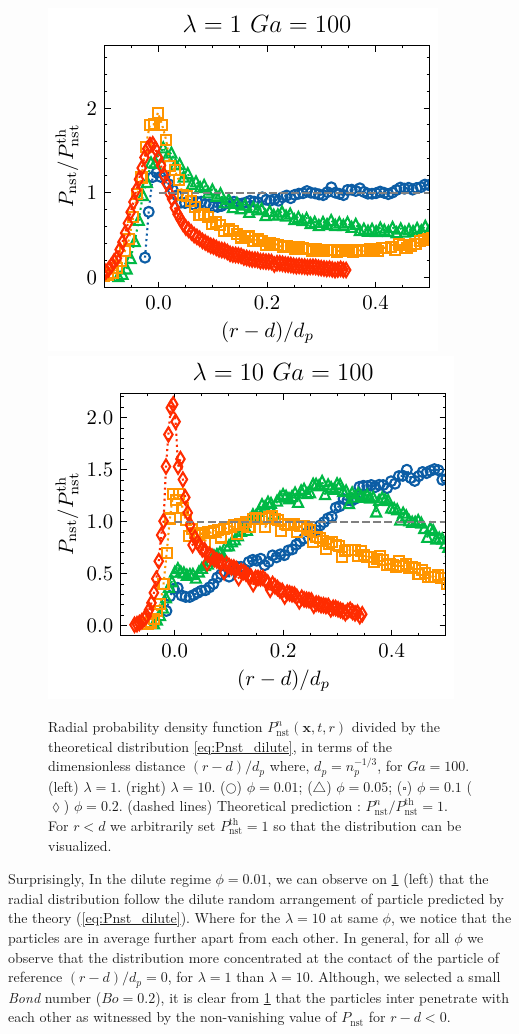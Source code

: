 \begin{figure}[h!]
    \centering
    \includegraphics[height=0.3\textwidth]{image/HOMOGENEOUS_NEW/Dist/Pr_l_1_Ga_100.pdf}
    \includegraphics[height=0.3\textwidth]{image/HOMOGENEOUS_NEW/Dist/Pr_l_10_Ga_100.pdf}
    \caption{Radial probability density function $P_\text{nst}^n(\textbf{x},t,r)$ divided by the theoretical distribution \ref{eq:Pnst_dilute}, in terms of the dimensionless distance $(r-d)/d_p$ where, $d_p = n_p^{-1/3}$, for  $Ga = 100$.
    (left)  $\lambda = 1$.
    (right) $\lambda = 10$.
    ($\pmb\bigcirc$) $\phi = 0.01$; ($\pmb\triangle$) $ \phi = 0.05$; ($\pmb\square$) $\phi = 0.1$ ($\pmb\lozenge$) $\phi = 0.2$.
    (dashed lines) Theoretical prediction : $P_\text{nst}^n/P_\text{nst}^\text{th} = 1$. 
    For $r<d$ we arbitrarily set $P_\text{nst}^\text{th} = 1$ so that the distribution can be visualized.
    }
    \label{fig:Pr}
\end{figure}
Surprisingly, In the dilute regime $\phi = 0.01$, we can observe on \ref{fig:Pr} (left) that the radial distribution follow the dilute random arrangement of particle predicted by the theory (\ref{eq:Pnst_dilute}). 
Where for the $\lambda = 10$ at same $\phi$, we notice that the particles are in average further apart from each other. 
In general, for all $\phi$ we observe that the distribution more concentrated at the contact of the particle of reference $(r-d)/d_p = 0$, for $\lambda = 1$ than $\lambda = 10$. 
Although, we selected a small \textit{Bond} number ($Bo = 0.2$), it is clear from \ref{fig:Pr} that the particles inter penetrate with each other as witnessed by the non-vanishing value of $P_\text{nst}$ for $r-d<0$.

